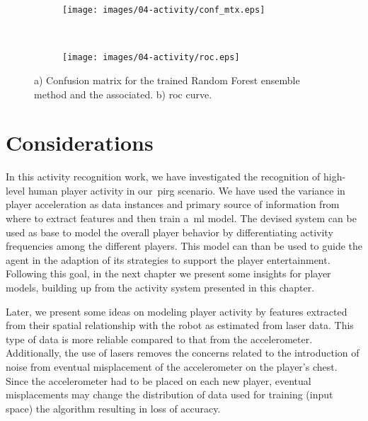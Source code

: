 \begin{figure}[h]
    \centering
    \begin{subfigure}[h]{7cm}
       \centering
       \texttt{[image: images/04-activity/conf\_mtx.eps]}
       \caption{}
	\end{subfigure}
	~
    \begin{subfigure}[h]{7cm}
     	\centering
        \texttt{[image: images/04-activity/roc.eps]}
        \caption{}
	\end{subfigure}
	\caption{a) Confusion matrix for the trained Random Forest ensemble method and the associated. b) \gls{roc} curve.}\label{fig:mtx-roc}
\end{figure}

\section{Considerations}

In this activity recognition work, we have investigated the recognition of high-level human player activity in our~\gls{pirg} scenario. We have used the variance in player acceleration as data instances and primary source of information from where to extract features and then train a~\gls{ml} model. The devised system can be used as base to model the overall player behavior by differentiating activity frequencies among the different players. This model can than be used to guide the agent in the adaption of its strategies to support the player entertainment. Following this goal, in the next chapter we present some insights for player models, building up from the activity system presented in this chapter.

Later, we present some ideas on modeling player activity by features extracted from their spatial relationship with the robot as estimated from laser data. This type of data is more reliable compared to that from the accelerometer. Additionally, the use of lasers removes the concerns related to the introduction of noise from eventual misplacement of the accelerometer on the player's chest. Since the accelerometer had to be placed on each new player, eventual misplacements may change the distribution of data used for training (input space) the algorithm resulting in loss of accuracy. 
